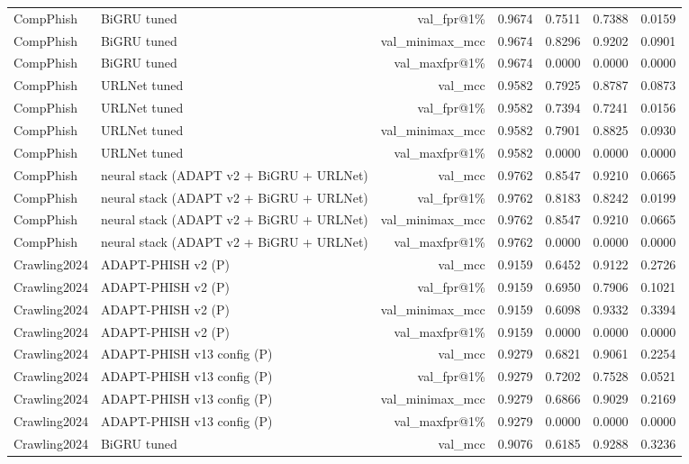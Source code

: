 \begin{table}[t]
\begin{tabular}{llrrrrr}
CompPhish & BiGRU tuned & val\_fpr@1\% & 0.9674 & 0.7511 & 0.7388 & 0.0159 \\
CompPhish & BiGRU tuned & val\_minimax\_mcc & 0.9674 & 0.8296 & 0.9202 & 0.0901 \\
CompPhish & BiGRU tuned & val\_maxfpr@1\% & 0.9674 & 0.0000 & 0.0000 & 0.0000 \\
CompPhish & URLNet tuned & val\_mcc & 0.9582 & 0.7925 & 0.8787 & 0.0873 \\
CompPhish & URLNet tuned & val\_fpr@1\% & 0.9582 & 0.7394 & 0.7241 & 0.0156 \\
CompPhish & URLNet tuned & val\_minimax\_mcc & 0.9582 & 0.7901 & 0.8825 & 0.0930 \\
CompPhish & URLNet tuned & val\_maxfpr@1\% & 0.9582 & 0.0000 & 0.0000 & 0.0000 \\
CompPhish & neural stack (ADAPT v2 + BiGRU + URLNet) & val\_mcc & 0.9762 & 0.8547 & 0.9210 & 0.0665 \\
CompPhish & neural stack (ADAPT v2 + BiGRU + URLNet) & val\_fpr@1\% & 0.9762 & 0.8183 & 0.8242 & 0.0199 \\
CompPhish & neural stack (ADAPT v2 + BiGRU + URLNet) & val\_minimax\_mcc & 0.9762 & 0.8547 & 0.9210 & 0.0665 \\
CompPhish & neural stack (ADAPT v2 + BiGRU + URLNet) & val\_maxfpr@1\% & 0.9762 & 0.0000 & 0.0000 & 0.0000 \\
Crawling2024 & ADAPT-PHISH v2 (P) & val\_mcc & 0.9159 & 0.6452 & 0.9122 & 0.2726 \\
Crawling2024 & ADAPT-PHISH v2 (P) & val\_fpr@1\% & 0.9159 & 0.6950 & 0.7906 & 0.1021 \\
Crawling2024 & ADAPT-PHISH v2 (P) & val\_minimax\_mcc & 0.9159 & 0.6098 & 0.9332 & 0.3394 \\
Crawling2024 & ADAPT-PHISH v2 (P) & val\_maxfpr@1\% & 0.9159 & 0.0000 & 0.0000 & 0.0000 \\
Crawling2024 & ADAPT-PHISH v13 config (P) & val\_mcc & 0.9279 & 0.6821 & 0.9061 & 0.2254 \\
Crawling2024 & ADAPT-PHISH v13 config (P) & val\_fpr@1\% & 0.9279 & 0.7202 & 0.7528 & 0.0521 \\
Crawling2024 & ADAPT-PHISH v13 config (P) & val\_minimax\_mcc & 0.9279 & 0.6866 & 0.9029 & 0.2169 \\
Crawling2024 & ADAPT-PHISH v13 config (P) & val\_maxfpr@1\% & 0.9279 & 0.0000 & 0.0000 & 0.0000 \\
Crawling2024 & BiGRU tuned & val\_mcc & 0.9076 & 0.6185 & 0.9288 & 0.3236 \\

\end{tabular}
\end{table}
